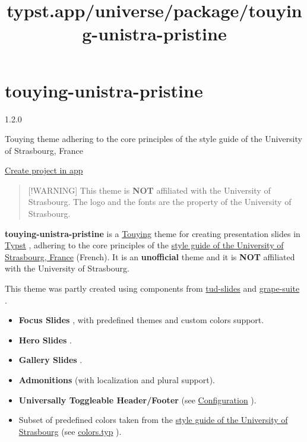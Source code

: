 \title{typst.app/universe/package/touying-unistra-pristine}

\label{banner}
\label{template-thumbnail}

\section{touying-unistra-pristine}\label{touying-unistra-pristine}

{ 1.2.0 }

Touying theme adhering to the core principles of the style guide of the
University of Strasbourg, France

\href{/app?template=touying-unistra-pristine&version=1.2.0}{Create
project in app}

\label{readme}
\begin{quote}
{[}!WARNING{]} This theme is \textbf{NOT} affiliated with the University
of Strasbourg. The logo and the fonts are the property of the University
of Strasbourg.
\end{quote}

\textbf{touying-unistra-pristine} is a
\href{https://github.com/touying-typ/touying}{Touying} theme for
creating presentation slides in
\href{https://github.com/typst/typst}{Typst} , adhering to the core
principles of the \href{https://langagevisuel.unistra.fr/}{style guide
of the University of Strasbourg, France} (French). It is an
\textbf{unofficial} theme and it is \textbf{NOT} affiliated with the
University of Strasbourg.

This theme was partly created using components from
\href{https://github.com/typst-tud/tud-slides}{tud-slides} and
\href{https://github.com/piepert/grape-suite}{grape-suite} .

\begin{itemize}
\tightlist
\item
  \textbf{Focus Slides} , with predefined themes and custom colors
  support.
\item
  \textbf{Hero Slides} .
\item
  \textbf{Gallery Slides} .
\item
  \textbf{Admonitions} (with localization and plural support).
\item
  \textbf{Universally Toggleable Header/Footer} (see
  \href{https://github.com/typst/packages/raw/main/packages/preview/touying-unistra-pristine/1.2.0/\#Configuration}{Configuration}
  ).
\item
  Subset of predefined colors taken from the
  \href{https://langagevisuel.unistra.fr/index.php?id=396}{style guide
  of the University of Strasbourg} (see
  \href{https://github.com/typst/packages/raw/main/packages/preview/touying-unistra-pristine/1.2.0/colors.typ}{colors.typ}
  ).
\end{itemize}

